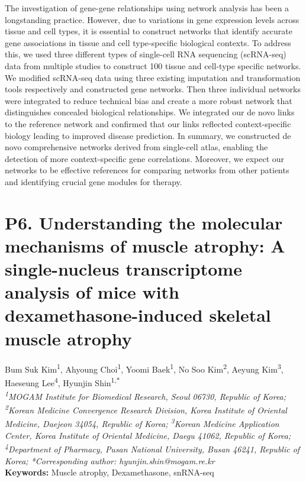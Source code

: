 \noindent
The investigation of gene-gene relationships using network analysis has been a longstanding practice. However, due to variations in gene expression levels across tissue and cell types, it is essential to construct networks that identify accurate gene associations in tissue and cell type-specific biological contexts. To address this, we used three different types of single-cell RNA sequencing (scRNA-seq) data from multiple studies to construct 100 tissue and cell-type specific networks. We modified scRNA-seq data using three existing imputation and transformation tools respectively and constructed gene networks. Then three individual networks were integrated to reduce technical bias and create a more robust network that distinguishes concealed biological relationships. We integrated our de novo links to the reference network and confirmed that our links reflected context-specific biology leading to improved disease prediction. In summary, we constructed de novo comprehensive networks derived from single-cell atlas, enabling the detection of more context-specific gene correlations. Moreover, we expect our networks to be effective references for comparing networks from other patients and identifying crucial gene modules for therapy.
\newpage

\section*{P6. Understanding the molecular mechanisms of muscle atrophy: A single-nucleus transcriptome analysis of mice with dexamethasone-induced skeletal muscle atrophy}

\begin{center}
Bum Suk Kim\textsuperscript{1}, Ahyoung Choi\textsuperscript{1}, Yoomi Baek\textsuperscript{1}, No Soo Kim\textsuperscript{2}, Aeyung Kim\textsuperscript{3}, Haeseung Lee\textsuperscript{4}, Hyunjin Shin\textsuperscript{1,*} \\
\vspace{0.2cm}
\textit{\textsuperscript{1}MOGAM Institute for Biomedical Research, Seoul 06730, Republic of Korea; \textsuperscript{2}Korean Medicine Convergence Research Division, Korea Institute of Oriental Medicine, Daejeon 34054, Republic of Korea; \textsuperscript{3}Korean Medicine Application Center, Korea Institute of Oriental Medicine, Daegu 41062, Republic of Korea; \textsuperscript{4}Department of Pharmacy, Pusan National University, Busan 46241, Republic of Korea; *Corresponding author: hyunjin.shin@mogam.re.kr} \\
\vspace{0.2cm}
\textbf{Keywords:} Muscle atrophy, Dexamethasone, snRNA-seq
\end{center}

